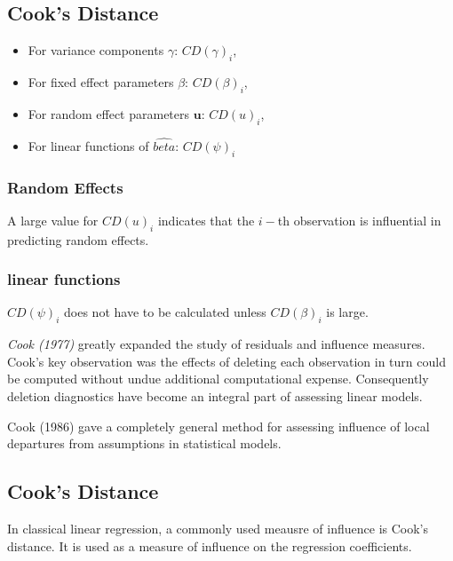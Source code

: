 \documentclass[Main.tex]{subfiles}
\begin{document}
	
	\subsection{Cook's Distance}
	\begin{itemize}
		\item For variance components $\gamma$: $CD(\gamma)_i$,
		\item For fixed effect parameters $\beta$: $CD(\beta)_i$,
		\item For random effect parameters $\boldsymbol{u}$: $CD(u)_i$,
		\item For linear functions of $\hat{beta}$: $CD(\psi)_i$
	\end{itemize}
	
	\newpage
	\subsubsection{Random Effects}
	
	A large value for $CD(u)_i$ indicates that the $i-$th observation is influential in predicting random effects.
	
	\subsubsection{linear functions}
	
	$CD(\psi)_i$ does not have to be calculated unless $CD(\beta)_i$ is large.
	
	
%	
%	
	\textit{Cook (1977)} greatly expanded the study of residuals and influence measures. Cook's key observation was the effects of deleting each observation in turn could be computed without undue additional computational expense. Consequently deletion diagnostics have become an integral part of assessing linear models.
	
	
	Cook (1986) gave a completely general method for assessing influence of local departures from
	assumptions in statistical models.
	
		
		\subsection{Cook's Distance}%
		In classical linear regression, a commonly used meausre of influence is Cook's distance. It is used as a measure of influence on the regression coefficients.
		
\end{document}
